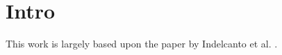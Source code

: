 \documentclass[a4paper,10pt]{article}
\theoremstyle{plain}
\theoremstyle{definition}
\theoremstyle{remark}
\begin{document}




\section{Intro}
This work is largely based upon the paper by Indelcanto et al. \cite{indelicatoetal2012}.
\end{document}
